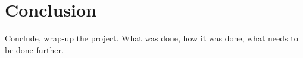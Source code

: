 \section{Conclusion}

Conclude, wrap-up the project. What was done, how it was done, what needs to be done further.
